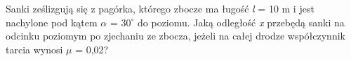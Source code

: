 Sanki ześlizgują się z pagórka, którego zbocze ma ługość \emph{l} = 10 m i jest nachylone pod kątem $\alpha$ = $30^{\circ}$ do poziomu. Jaką odległość \emph{x} przebędą sanki na odcinku poziomym po zjechaniu ze zbocza, jeżeli na całej drodze współczynnik tarcia wynosi $\mu$ = 0,02?


